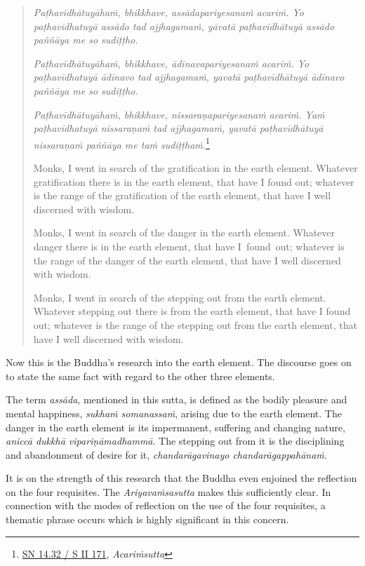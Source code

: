 \begin{quote}
\emph{Paṭhavīdhātuyāhaṁ, bhikkhave, assādapariyesanaṁ acariṁ. Yo paṭhavīdhatuyā assādo tad ajjhagamaṁ, yāvatā paṭhavīdhātuyā assādo paññāya me so sudiṭṭho.}

\emph{Paṭhavīdhātuyāhaṁ, bhikkhave, ādīnavapariyesanaṁ acariṁ. Yo paṭhavīdhatuyā ādīnavo tad ajjhagamaṁ, yavatā paṭhavīdhātuyā ādīnavo paññāya me so sudiṭṭho.}

\emph{Paṭhavīdhātuyāhaṁ, bhikkhave, nissaraṇapariyesanaṁ acariṁ. Yaṁ paṭhavīdhatuyā nissaraṇaṁ tad ajjhagamaṁ, yavatā paṭhavīdhātuyā nissaraṇaṁ paññāya me taṁ sudiṭṭhaṁ.}\footnote{\href{https://suttacentral.net/sn14.32/pli/ms}{SN 14.32 / S II 171}, \emph{Acariṁsutta}}

Monks, I went in search of the gratification in the earth element. Whatever gratification there is in the earth element, that have I found out; whatever is the range of the gratification of the earth element, that have I well discerned with wisdom.

Monks, I went in search of the danger in the earth element. Whatever danger there is in the earth element, that have I~found~out; whatever is the range of the danger of the earth element, that have I well discerned with wisdom.

Monks, I went in search of the stepping out from the earth element. Whatever stepping out there is from the earth element, that have I found out; whatever is the range of the stepping out from the earth element, that have I well discerned with wisdom.
\end{quote}

Now this is the Buddha's research into the earth element. The discourse goes on to state the same fact with regard to the other three elements.

The term \emph{assāda}, mentioned in this sutta, is defined as the bodily pleasure and mental happiness, \emph{sukhaṁ somanassaṁ}, arising due to the earth element. The danger in the earth element is its impermanent, suffering and changing nature, \emph{aniccā dukkhā vipariṇāmadhammā}. The stepping out from it is the disciplining and abandonment of desire for it, \emph{chandarāgavinayo chandarāgappahānaṁ}.

It is on the strength of this research that the Buddha even enjoined the reflection on the four requisites. The \emph{Ariyavaṁsasutta} makes this sufficiently clear. In connection with the modes of reflection on the use of the four requisites, a thematic phrase occurs which is highly significant in this concern.

